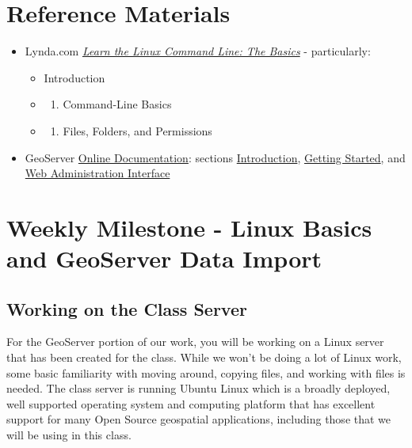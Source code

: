 \documentclass[]{book}
\providecommand{\tightlist}{%
  \setlength{\itemsep}{0pt}\setlength{\parskip}{0pt}}
\begin{document}
\section{Reference Materials}\label{week13-reference}

\begin{itemize}
\tightlist
\item
  Lynda.com
  \href{http://www.lynda.com/Linux-tutorials/Learn-Linux-Command-Line-Basics/435539-2.html?org=unm.edu}{\emph{Learn
  the Linux Command Line: The Basics}} - particularly:

  \begin{itemize}
  \item
    Introduction
  \item
    \begin{enumerate}
    \def\labelenumi{\arabic{enumi}.}
    \tightlist
    \item
      Command-Line Basics
    \end{enumerate}
  \item
    \begin{enumerate}
    \def\labelenumi{\arabic{enumi}.}
    \setcounter{enumi}{1}
    \tightlist
    \item
      Files, Folders, and Permissions
    \end{enumerate}
  \end{itemize}
\item
  GeoServer
  \href{http://docs.geoserver.org/stable/en/user/index.html}{Online
  Documentation}: sections
  \href{http://docs.geoserver.org/stable/en/user/introduction/index.html}{Introduction},
  \href{http://docs.geoserver.org/stable/en/user/gettingstarted/index.html}{Getting
  Started}, and
  \href{http://docs.geoserver.org/stable/en/user/webadmin/index.html}{Web
  Administration Interface}
\end{itemize}

\section{Weekly Milestone - Linux Basics and GeoServer Data
Import}\label{week13-milestone}

\subsection{Working on the Class
Server}\label{working-on-the-class-server}

For the GeoServer portion of our work, you will be working on a Linux
server that has been created for the class. While we won't be doing a
lot of Linux work, some basic familiarity with moving around, copying
files, and working with files is needed. The class server is running
Ubuntu Linux which is a broadly deployed, well supported operating
system and computing platform that has excellent support for many Open
Source geospatial applications, including those that we will be using in
this class.
\end{document}
